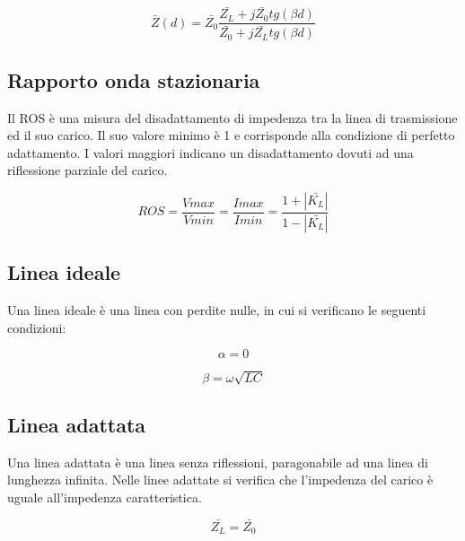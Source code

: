 \documentclass{article}
\begin{document}
    \begin{equation}
        \bar{Z}(d) = \bar{Z_0} \frac{
            \bar{Z_L} + j \bar{Z_0} tg (\beta d)
        }{
            \bar{Z_0} + j \bar{Z_L} tg (\beta d)
        }
    \end{equation}

    \subsection{Rapporto onda stazionaria}

    Il ROS è una misura del disadattamento di impedenza tra la linea di trasmissione ed il suo carico. Il suo valore minimo
    è 1 e corrisponde alla condizione di perfetto adattamento. I valori maggiori indicano un disadattamento dovuti ad una
    riflessione parziale del carico.

    \begin{equation}
        ROS = \frac{Vmax}{Vmin} =
        \frac{Imax}{Imin} =
        \frac{
            1 + |\bar{K_L}|
        }{
            1 - |\bar{K_L}|
        }
    \end{equation}

    \subsection{Linea ideale}

    Una linea ideale è una linea con perdite nulle, in cui si verificano le seguenti condizioni:

    \begin{equation}
        \alpha = 0
    \end{equation}

    \begin{equation}    
        \beta = \omega \sqrt{LC}
    \end{equation}

    \subsection{Linea adattata}

    Una linea adattata è una linea senza riflessioni, paragonabile ad una linea di lunghezza infinita.
    Nelle linee adattate si verifica che l'impedenza del carico è uguale all'impedenza caratteristica.

    \begin{equation}
        \bar{Z_L} = \bar{Z_0}
    \end{equation}
\end{document}
